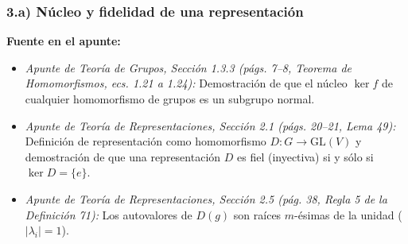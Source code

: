 \documentclass[11pt, a4paper]{article}
\begin{document}
\subsubsection*{3.a) Núcleo y fidelidad de una representación}
\textbf{Fuente en el apunte:}
\begin{itemize}
    \item \textit{Apunte de Teoría de Grupos, Sección 1.3.3 (págs. 7--8, Teorema de Homomorfismos, ecs. 1.21 a 1.24):} Demostración de que el núcleo $\ker f$ de cualquier homomorfismo de grupos es un subgrupo normal.
    \item \textit{Apunte de Teoría de Representaciones, Sección 2.1 (págs. 20--21, Lema 49):} Definición de representación como homomorfismo $D : G \to \text{GL}(V)$ y demostración de que una representación $D$ es fiel (inyectiva) si y sólo si $\ker D = \{e\}$.
    \item \textit{Apunte de Teoría de Representaciones, Sección 2.5 (pág. 38, Regla 5 de la Definición 71):} Los autovalores de $D(g)$ son raíces $m$-ésimas de la unidad ($|\lambda_i| = 1$).
\end{itemize}
\end{document}
